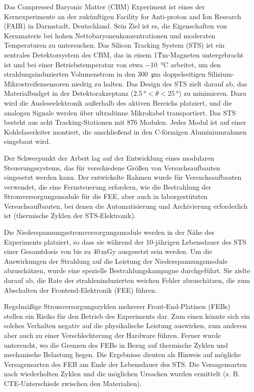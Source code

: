Das Compressed Baryonic Matter (\gls{CBM}) Experiment ist eines der Kernexperimente an der zukünftigen Facility for Anti-proton and Ion Research (FAIR) in Darmstadt, Deutschland. Sein Ziel ist es, die Eigenschaften von Kernmaterie bei hohen Nettobaryonenkonzentrationen und moderaten Temperaturen zu untersuchen. Das Silicon Tracking System (\gls{STS}) ist ein zentrales Detektorsystem des \gls{CBM}, das in einem 1\~Tm-Magneten untergebracht ist und bei einer Betriebstemperatur von etwa \SI{-10}{\celsius} arbeitet, um den strahlungsinduzierten Volumenstrom in den \SI{300}{\micro\metre} doppelseitigen Silizium-Mikrostreifensensoren niedrig zu halten. Das Design des \gls{STS} zielt darauf ab, das Materialbudget in der Detektorakzeptanz ($\SI{2.5}{\degree} < \theta < \SI{25}{\degree}$) zu minimieren. Dazu wird die Ausleseelektronik außerhalb des aktiven Bereichs platziert, und die analogen Signale werden über ultradünne Mikrokabel transportiert. Das \gls{STS} besteht aus acht Tracking-Stationen mit 876 Modulen. Jedes Modul ist auf einer Kohlefaserleiter montiert, die anschließend in den C-förmigen Aluminiumrahmen eingebaut wird. 

Der Schwerpunkt der Arbeit lag auf der Entwicklung eines modularen Steuerungssystems, das für verschiedene Größen von Versuchsaufbauten eingesetzt werden kann. Der entwickelte Rahmen wurde für Versuchsaufbauten verwendet, die eine Fernsteuerung erfordern, wie die Bestrahlung der Stromversorgungsmodule für die \gls{FEE}, aber auch in laborgestützten Versuchsaufbauten, bei denen die Automatisierung und Archivierung erforderlich ist (thermische Zyklen der \gls{STS}-Elektronik).

Die Niederspannungsstromversorgungsmodule werden in der Nähe des Experiments platziert, so dass sie während der 10-jährigen Lebensdauer des \gls{STS} einer Gesamtdosis von bis zu 40\,mGy ausgesetzt sein werden. Um die Auswirkungen der Strahlung auf die Leistung der Niederspannungsmodule abzuschätzen, wurde eine spezielle Bestrahlungskampagne durchgeführt. Sie zielte darauf ab, die Rate der strahleninduzierten weichen Fehler abzuschätzen, die zum Abschalten der Frontend-Elektronik (\gls{FEE}) führen.

Regelmäßige Stromversorgungszyklen mehrerer Front-End-Platinen (\glspl{FEB}) stellen ein Risiko für den Betrieb des Experiments dar.  Zum einen könnte sich ein solches Verhalten negativ auf die physikalische Leistung auswirken, zum anderen aber auch zu einer Verschlechterung der Hardware führen. Ferner wurde untersucht, wo die Grenzen des \glspl{FEB} in Bezug auf thermische Zyklen und mechanische Belastung liegen. Die Ergebnisse dienten als Hinweis auf mögliche Versagensarten des \gls{FEB} am Ende der Lebensdauer des \gls{STS}. Die Versagensarten nach wiederholten Zyklen und die möglichen Ursachen wurden ermittelt (z. B. \gls{CTE}-Unterschiede zwischen den Materialien). 

